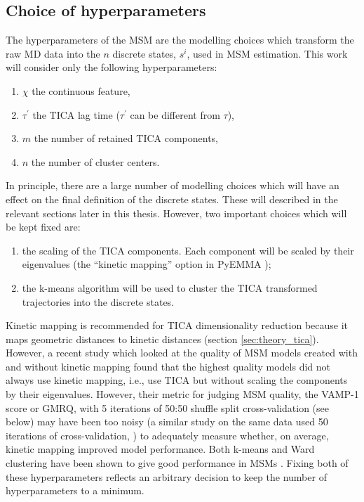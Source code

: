 \subsection{Choice of hyperparameters}\label{sec:theory_choice_hyp}
The hyperparameters of the MSM are the modelling choices which transform the raw MD data into the $n$ discrete states, $s^{i}$, used in MSM estimation. This work will consider only the following hyperparameters: 
\begin{enumerate}
    \item $\chi$ the continuous feature,
    \item $\tau^{\prime}$ the TICA lag time ($\tau^{\prime}$ can be different from $\tau$), 
    \item $m$ the number of retained TICA components, 
    \item $n$ the number of cluster centers. 
\end{enumerate}
In principle, there are a large number of modelling choices which will have an effect on the final definition of the discrete states. These will described in the relevant sections later in this thesis. However, two important choices which will be kept fixed are: 
\begin{enumerate}
    \item the scaling of the TICA components. Each component will be scaled by their eigenvalues (the ``kinetic mapping'' option in PyEMMA \cite{schererPyEMMASoftwarePackage2015a});
    \item the k-means \cite{lloydLeastSquaresQuantization1982} algorithm will be used to cluster the TICA transformed trajectories into the discrete states. 
\end{enumerate}


Kinetic mapping is recommended for TICA dimensionality reduction \cite{noeKineticDistanceKinetic2015} because it maps geometric distances to kinetic distances (section \ref{sec:theory_tica}).  However, a recent study which looked at the quality of MSM models created with and without kinetic mapping  \cite{husicOptimizedParameterSelection2016} found that the highest quality models did not always use kinetic mapping, i.e., use TICA but without scaling the components by their eigenvalues.  However, their metric for judging MSM quality, the VAMP-1 score or GMRQ, with 5 iterations of 50:50 shuffle split cross-validation (see below) may have been too noisy (a similar study on the same data used 50 iterations of cross-validation, \cite{schererVariationalSelectionFeatures2019}) to adequately measure whether, on average, kinetic mapping improved model performance. Both k-means and Ward clustering have been shown to give good performance in MSMs \cite{husicWardClusteringImproves2017a}. Fixing both of these hyperparameters reflects an arbitrary decision to keep the number of hyperparameters to a minimum.

